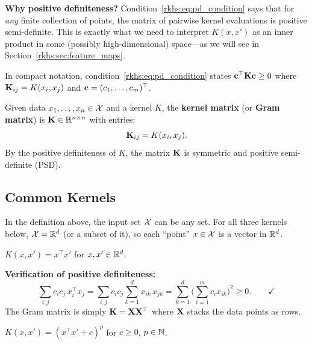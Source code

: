 \begin{notechapter}
\textbf{Why positive definiteness?} Condition~\eqref{rkhs:eq:pd_condition}
says that for \emph{any} finite collection of points, the matrix of
pairwise kernel evaluations is positive semi-definite. This is exactly
what we need to interpret $K(x,x')$ as an inner product in some
(possibly high-dimensional) space---as we will see in
Section~\ref{rkhs:sec:feature_maps}.

In compact notation, condition~\eqref{rkhs:eq:pd_condition} states
$\mathbf{c}^\top \mathbf{K} \mathbf{c} \geq 0$ where $\mathbf{K}_{ij} = K(x_i, x_j)$
and $\mathbf{c} = (c_1, \ldots, c_m)^\top$.

\begin{definitionbox}
\begin{definition}
\label{rkhs:def:gram_matrix}
Given data $x_1, \ldots, x_n \in \mathcal{X}$ and a kernel $K$, the
\textbf{kernel matrix} (or \textbf{Gram matrix}) is $\mathbf{K} \in \mathbb{R}^{n
\times n}$ with entries:
\[
\mathbf{K}_{ij} = K(x_i, x_j).
\]
By the positive definiteness of $K$, the matrix $\mathbf{K}$ is symmetric
and positive semi-definite (PSD).
\end{definition}
\end{definitionbox}

\subsection{Common Kernels}
\label{rkhs:subsec:common_kernels}

In the definition above, the input set $\mathcal{X}$ can be any
set. For all three kernels below, $\mathcal{X} = \mathbb{R}^d$ (or a
subset of it), so each ``point'' $x \in \mathcal{X}$ is a
vector in $\mathbb{R}^d$.

\begin{examplebox}
$K(x,x') = x^\top x'$ for $x, x' \in \mathbb{R}^d$.

\textbf{Verification of positive definiteness:}
\[
\sum_{i,j} c_i c_j\, x_i^\top x_j = \sum_{i,j} c_i c_j
\sum_{k=1}^d x_{ik}\, x_{jk} = \sum_{k=1}^d
\biggl(\sum_{i=1}^m c_i x_{ik}\biggr)^{\!2} \geq 0.
\qquad\checkmark
\]
The Gram matrix is simply
$\mathbf{K} = \mathbf{X}\mathbf{X}^\top$ where $\mathbf{X}$ stacks
the data points as rows.
\end{examplebox}

\begin{examplebox}
$K(x,x') = (x^\top x' + c)^p$ for $c \geq 0$,
$p \in \mathbb{N}$.


\end{examplebox}
\end{notechapter}
